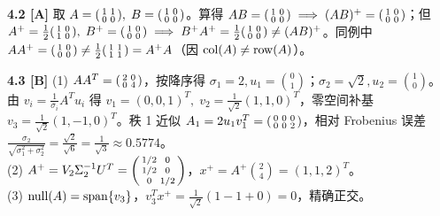 \textbf{4.2 [A]}
取 $A = \begin{psmallmatrix}1&1\\0&0\end{psmallmatrix},\; B = \begin{psmallmatrix}1&0\\0&0\end{psmallmatrix}$。算得 $AB = \begin{psmallmatrix}1&0\\0&0\end{psmallmatrix} \implies (AB)^+ = \begin{psmallmatrix}1&0\\0&0\end{psmallmatrix}$；但 $A^+ = \frac{1}{2}\begin{psmallmatrix}1&0\\1&0\end{psmallmatrix},\; B^+ = \begin{psmallmatrix}1&0\\0&0\end{psmallmatrix} \implies B^+ A^+ = \frac{1}{2}\begin{psmallmatrix}1&0\\0&0\end{psmallmatrix} \neq (AB)^+$。同例中 $AA^+ = \begin{psmallmatrix}1&0\\0&0\end{psmallmatrix} \neq \frac{1}{2}\begin{psmallmatrix}1&1\\1&1\end{psmallmatrix} = A^+A$（因 $\operatorname{col}(A)\neq \operatorname{row}(A)$）。

\textbf{4.3 [B]}
(1) $AA^T = \begin{psmallmatrix}2&0\\0&4\end{psmallmatrix}$，按降序得 $\sigma_1 = 2, u_1 = \binom{0}{1}$；$\sigma_2 = \sqrt{2}, u_2 = \binom{1}{0}$。由 $v_i = \frac{1}{\sigma_i}A^T u_i$ 得 $v_1 = (0,0,1)^T,\; v_2 = \frac{1}{\sqrt{2}}(1,1,0)^T$，零空间补基 $v_3 = \frac{1}{\sqrt{2}}(1,-1,0)^T$。秩 1 近似 $A_1 = 2 u_1 v_1^T = \begin{psmallmatrix}0&0&0\\0&0&2\end{psmallmatrix}$，相对 Frobenius 误差 $\frac{\sigma_2}{\sqrt{\sigma_1^2+\sigma_2^2}} = \frac{\sqrt{2}}{\sqrt{6}} = \frac{1}{\sqrt{3}}\approx 0.5774$。\\
(2) $A^+ = V_2\Sigma_2^{-1}U^T = \begin{psmallmatrix}1/2 & 0\\ 1/2 & 0\\ 0 & 1/2\end{psmallmatrix}$，$x^+ = A^+\binom{2}{4} = (1,1,2)^T$。\\
(3) $\operatorname{null}(A) = \operatorname{span}\{v_3\}$，$v_3^T x^+ = \frac{1}{\sqrt{2}}(1 - 1 + 0) = 0$，精确正交。

